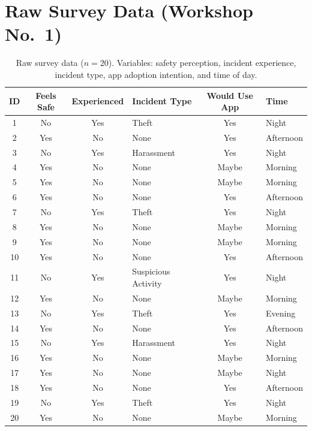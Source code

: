 \documentclass[11pt,a4paper]{article}
\begin{document}
\newpage
\appendix
\section{Raw Survey Data (Workshop No.\ 1)}

\begin{table}[H]
\centering
\caption{Raw survey data ($n = 20$). Variables: safety perception, incident experience, incident type, app adoption intention, and time of day.}
\label{tab:survey}
\footnotesize
\begin{tabular}{c c c l c l}
\toprule
\textbf{ID} & \textbf{Feels Safe} & \textbf{Experienced} & \textbf{Incident Type} & \textbf{Would Use App} & \textbf{Time} \\
\midrule
1 & No & Yes & Theft & Yes & Night \\
2 & Yes & No & None & Yes & Afternoon \\
3 & No & Yes & Harassment & Yes & Night \\
4 & Yes & No & None & Maybe & Morning \\
5 & Yes & No & None & Maybe & Morning \\
6 & Yes & No & None & Yes & Afternoon \\
7 & No & Yes & Theft & Yes & Night \\
8 & Yes & No & None & Maybe & Morning \\
9 & Yes & No & None & Maybe & Morning \\
10 & Yes & No & None & Yes & Afternoon \\
11 & No & Yes & Suspicious Activity & Yes & Night \\
12 & Yes & No & None & Maybe & Morning \\
13 & No & Yes & Theft & Yes & Evening \\
14 & Yes & No & None & Yes & Afternoon \\
15 & No & Yes & Harassment & Yes & Night \\
16 & Yes & No & None & Maybe & Morning \\
17 & Yes & No & None & Maybe & Night \\
18 & Yes & No & None & Yes & Afternoon \\
19 & No & Yes & Theft & Yes & Night \\
20 & Yes & No & None & Maybe & Morning \\
\bottomrule
\end{tabular}
\end{table}
\end{document}

